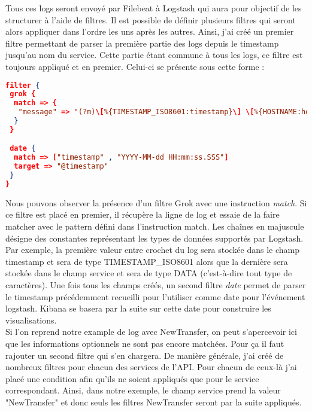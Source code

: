 	Tous ces logs seront envoyé par Filebeat à Logstash qui aura pour objectif de les structurer à l'aide de filtres. Il est possible de définir plusieurs filtres qui seront alors appliquer dans l'ordre les uns après les autres. Ainsi, j'ai créé un premier filtre permettant de parser la première partie des logs depuis le timestamp jusqu'au nom du service. Cette partie étant commune à tous les logs, ce filtre est toujours appliqué et en premier. Celui-ci se présente sous cette forme :
	
\begin{lstlisting}[language=json]
filter {
 grok {
  match => {
   "message" => "(?m)\[%{TIMESTAMP_ISO8601:timestamp}\] \[%{HOSTNAME:host}\] \[%{DATA:thread}\] %{LOGLEVEL:logLevel} %{DATA:class}@%{DATA:method}:%{DATA:line} \- \[ANALYTICS\] \[%{DATA:username}\] \[%{DATA:microservice}\] \[%{DATA:service}\]"
  }
 }

 date {
  match => ["timestamp" , "YYYY-MM-dd HH:mm:ss.SSS"]
  target => "@timestamp"
 }
}
\end{lstlisting}

	Nous pouvons observer la présence d'un filtre Grok avec une instruction \textit{match}. Si ce filtre est placé en premier, il récupère la ligne de log et essaie de la faire matcher avec le pattern défini dans l'instruction match. Les chaînes en majuscule désigne des constantes représentant les types de données supportés par Logstash. Par exemple, la première valeur entre crochet du log sera stockée dans le champ timestamp et sera de type TIMESTAMP\_ISO8601 alors que la dernière sera stockée dans le champ service et sera de type DATA (c'est-à-dire tout type de caractères). Une fois tous les champs créés, un second filtre \textit{date} permet de parser le timestamp précédemment recueilli pour l'utiliser comme date pour l'événement logstash. Kibana se basera par la suite sur cette date pour construire les visualisations. \\
	
	Si l'on reprend notre example de log avec NewTransfer, on peut s'apercevoir ici que les informations optionnels ne sont pas encore matchées. Pour ça il faut rajouter un second filtre qui s'en chargera. De manière générale, j'ai créé de nombreux filtres pour chacun des services de l'API. Pour chacun de ceux-là j'ai placé une condition afin qu'ils ne soient appliqués que pour le service correspondant. Ainsi, dans notre exemple, le champ service prend la valeur "NewTransfer" et donc seuls les filtres NewTransfer seront par la suite appliqués. \\
	
